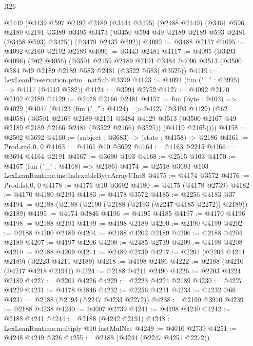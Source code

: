 \begin{lexlean}{R26}
\begin{coremodule}
    @2449
    (@3439
      @597
      @2192
      @2189
      (@3444 @3495)
      (@2488 @2449)
      (@3461
        @596
        @2189
        @2191
        @3389
        @3495
        @3473
        (@3450 @594 @49 @2189 @2189 @593 @2481 (@3458 @593) @3475))
      (@3479 @2435 @592))
@4092 := @3488 @2157
@4095 := @4092 @2160 @2192 @2189
@4096 := @3443 @2481
@4117 := @4095
    (@3493 @4096)
    (@62 @4056)
    (@3501
      @2159
      @2189
      @2191
      @3484
      @4096
      @3513
      (@3500 @584 @49 @2189 @2189 @583 @2481 (@3522 @583) @3525))
@4119 := LexLeanPreservation.prim_natSub @3399
@4123 := @4091 (fun ("_" : @3995) => @4117 (@4119 @582))
@4124 := @3994 @2752
@4127 := @4092 @2170 @2192 @2189
@4129 := @2478 @2166 @2481
@4157 := fun (byte : @103) =>
  @4029
    (@4047
      (@4123
        (fun ("_" : @4124) =>
        @4127
          (@3493 @4129)
          (@62 @4058)
          (@3501
            @2169
            @2189
            @2191
            @3484
            @4129
            @3513
            (@3500 @2167 @49 @2189 @2189 @2166 @2481 (@3522 @2166) @3525))
          (@4119 @2165))))
@4158 := @2502 @3692
@4160 := (subject : @3683) -> (state : @4158) -> @2186
@4161 := Prod.snd.{0, 0}
@4163 := @4161 @10 @3692
@4164 := @4163 @2215
@4166 := @3694 @4164 @2191
@4167 := @3690 @103
@4168 := @2515 @103
@4170 := @4167 (fun ("_" : @4168) => @2186)
@4174 := @2518 @3683 @103 LexLeanRuntime.instIndexableByteArrayUInt8
@4175 := @4174 @3572
@4176 := Prod.fst.{0, 0}
@4178 := @4176 @10 @3692
@4180 := @4175 (@4178 @2739)
@4182 := @4170 @4180 @2191
@4183 := @4178 @3572
@4185 := @2256 @4183 @37
@4194 := @2188 (@2188 (@2190 (@2188 (@2193 (@2247 @4185 @2272)) @2189)) @2189)
@4195 := @4174 @3846
@4196 := @4195 @4185
@4197 := @4170 @4196
@4198 := @2188 @2191
@4199 := @4198 @2189
@4200 := @2190 @4199
@4202 := @2188 @4200 @2189
@4204 := @2188 @4202 @2189
@4206 := @2188 @4204 @2189
@4207 := @4197 @4206
@4208 := @2485 @2739
@4209 := @4198 @4208
@4210 := @2188 @4209
@4211 := @2489 @2739
@4217 := @2201 (@2203 @4211 @2189) (@2223 @4211 @2189)
@4218 := @4198 @2486
@4222 := @2188 (@4210 (@4217 @4218 @2191))
@4224 := @2188 @4211 @2490
@4226 := @2203 @4224 @2189
@4227 := @2201 @4226
@4229 := @2223 @4224 @2189
@4230 := @4227 @4229
@4231 := @4178 @3846
@4232 := @2256 @4231
@4233 := @4232 @66
@4237 := @2188 (@2193 (@2247 @4233 @2272))
@4238 := @2190 @3970
@4239 := @2188 @4238
@4240 := @4007 @2739
@4241 := @4198 @4240
@4242 := @2188 @4241
@4244 := @2188 (@4242 @2191)
@4248 := LexLeanRuntime.multiply @10 instMulNat
@4249 := @4010 @2739
@4251 := @4248 @4249 @326
@4255 := @2188 (@4244 (@2247 @4251 @2272))

\end{coremodule}
\end{lexlean}

